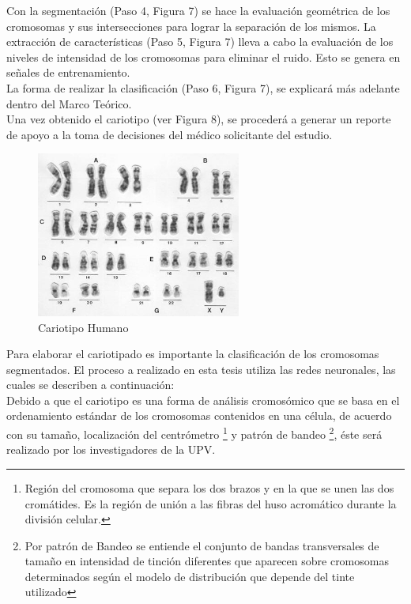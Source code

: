 \documentclass[12pt,letterpaper,titlepage]{article}
\begin{document}
\begin{itemize}
Con la segmentación (Paso 4, Figura 7) se hace la evaluación geométrica de los cromosomas y sus intersecciones para lograr la separación de los mismos. La extracción de características (Paso 5, Figura 7) lleva a cabo la evaluación de los niveles de intensidad de los cromosomas para eliminar el ruido. Esto se genera en señales de entrenamiento.\\

La forma de realizar la clasificación (Paso 6, Figura 7), se explicará más adelante dentro del Marco Teórico.\\


Una vez obtenido el cariotipo (ver Figura 8), se procederá a generar un reporte de apoyo a la toma de decisiones del médico solicitante del estudio.\\

\begin{figure}
  \centering
    \includegraphics[width=0.6\textwidth]{8_CariotipoHumano1}
  \caption{Cariotipo Humano}
  \label{fig8:CariotipoHumano}
\end{figure}


Para elaborar el cariotipado es importante la clasificación de los cromosomas segmentados. El proceso a realizado en esta tesis utiliza las redes neuronales, las cuales se describen a continuación:\\

Debido a que el cariotipo es una forma de análisis cromosómico que se basa en el ordenamiento estándar de los cromosomas contenidos en una célula, de acuerdo con su tamaño, localización del centrómetro \footnote{Región del cromosoma que separa los dos brazos y en la que se unen las dos cromátides. Es la región de unión a las fibras del huso acromático durante la división celular.} y patrón de bandeo \footnote{Por patrón de Bandeo se entiende el conjunto de bandas transversales de tamaño en intensidad de tinción diferentes que aparecen sobre cromosomas determinados según el modelo de distribución que depende del tinte utilizado}, éste será realizado por los investigadores de la UPV.\\


\end{itemize}
\end{document}
